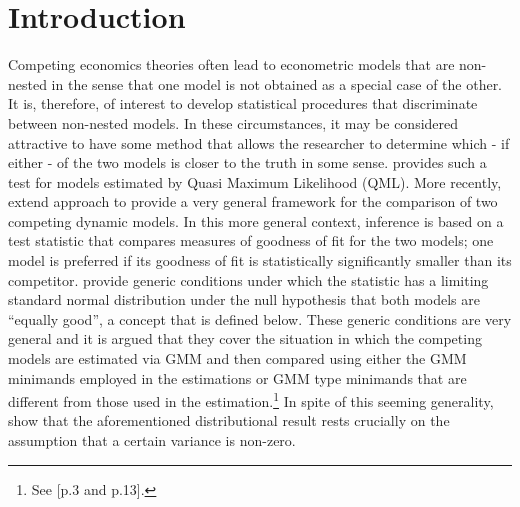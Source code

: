 \documentclass[titlepage,11pt]{article}
\begin{document}
\section{Introduction}
Competing economics theories often lead to econometric models that are non-nested in the sense that one model is not obtained as a special case of the other. It is, therefore, of interest to develop
statistical procedures that discriminate between non-nested models. In these circumstances, it may be considered attractive to have some method that allows the researcher to determine which  - if either - of the two models is closer to the truth in some sense.  provides such a test for models estimated by Quasi Maximum Likelihood (QML). More recently,  extend  approach to provide a very general framework for the comparison of two competing dynamic models. In this more general context, inference is based on a test statistic that compares measures of goodness of fit for the two models; one model is preferred if its goodness of fit is statistically significantly smaller than its competitor.  provide generic conditions under which the statistic has a limiting standard normal distribution under the null hypothesis that both models are ``equally good'', a concept that is defined below. These generic conditions are very general and it is argued that they cover the situation in which the competing models are estimated via GMM and then compared using either the GMM minimands employed in the estimations or GMM type minimands that are different from those used in the estimation.\footnote{See [p.3 and
  p.13].} In spite of this seeming generality,  show that the aforementioned distributional result rests crucially on the assumption that a certain
variance is non-zero.
\end{document}

